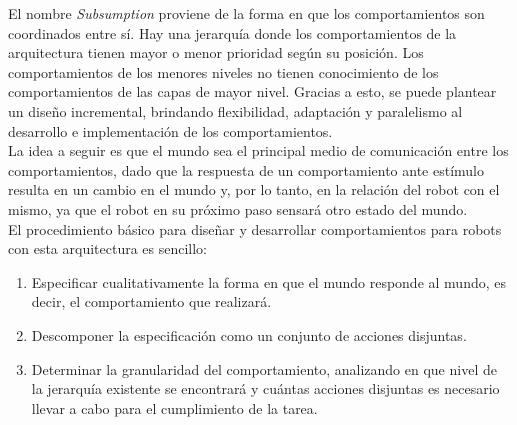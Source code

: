 El nombre \emph{Subsumption} proviene de la forma en que los comportamientos son coordinados entre s\'i. Hay
una jerarqu\'ia donde los comportamientos de la arquitectura tienen mayor o menor prioridad seg\'un su posici\'on.
Los comportamientos de los menores niveles no tienen conocimiento de los comportamientos de las capas de mayor
nivel. Gracias a esto, se puede plantear un dise\~no incremental, brindando flexibilidad, adaptaci\'on y paralelismo
al desarrollo e implementaci\'on de los comportamientos.
\\
La idea a seguir es que el mundo sea el principal medio de comunicaci\'on entre los comportamientos, dado que la respuesta
de un comportamiento ante est\'imulo resulta en un cambio en el mundo y, por lo tanto, en la relaci\'on del robot con el mismo,
ya que el robot en su pr\'oximo paso sensar\'a otro estado del mundo.
\\
El procedimiento b\'asico para dise\~nar y desarrollar comportamientos para robots con esta arquitectura es sencillo:
\begin{enumerate}
\item Especificar cualitativamente la forma en que el mundo responde al mundo, es decir, el comportamiento que realizar\'a.
\item Descomponer la especificaci\'on como un conjunto de acciones disjuntas.
\item Determinar la granularidad del comportamiento, analizando en que nivel de la jerarqu\'ia existente se encontrar\'a y 
cu\'antas acciones disjuntas es necesario llevar a cabo para el cumplimiento de la tarea.
\end{enumerate}

